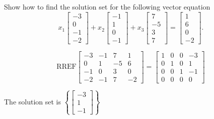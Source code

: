 
\begin{exerciseStatement}


Show how to find the solution set for the following vector equation \[ x_{1} \left[\begin{array}{c}
-3 \\
0 \\
-1 \\
-2
\end{array}\right] + x_{2} \left[\begin{array}{c}
-1 \\
1 \\
0 \\
-1
\end{array}\right] + x_{3} \left[\begin{array}{c}
7 \\
-5 \\
3 \\
7
\end{array}\right] = \left[\begin{array}{c}
1 \\
6 \\
0 \\
-2
\end{array}\right] .\]


\end{exerciseStatement}
    
\begin{exerciseAnswer} 
\[\mathrm{RREF} \left[\begin{array}{ccc|c}
-3 & -1 & 7 & 1 \\
0 & 1 & -5 & 6 \\
-1 & 0 & 3 & 0 \\
-2 & -1 & 7 & -2
\end{array}\right]  =  \left[\begin{array}{ccc|c}
1 & 0 & 0 & -3 \\
0 & 1 & 0 & 1 \\
0 & 0 & 1 & -1 \\
0 & 0 & 0 & 0
\end{array}\right] \]

The solution set is \( \left\{ \left[\begin{array}{c}
-3 \\
1 \\
-1
\end{array}\right] \right\} \)


\end{exerciseAnswer}
    
